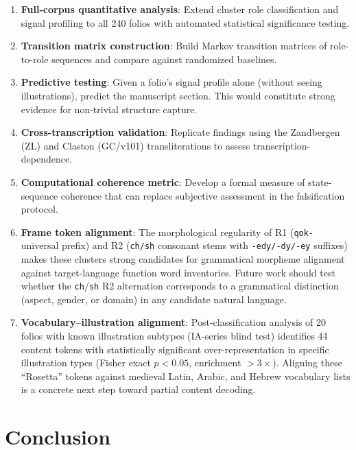 \documentclass[11pt,a4paper,twocolumn]{article}
\begin{document}
\begin{enumerate}[leftmargin=*,itemsep=2pt]
    \item \textbf{Full-corpus quantitative analysis}: Extend cluster role classification and signal profiling to all 240 folios with automated statistical significance testing.
    \item \textbf{Transition matrix construction}: Build Markov transition matrices of role-to-role sequences and compare against randomized baselines.
    \item \textbf{Predictive testing}: Given a folio's signal profile alone (without seeing illustrations), predict the manuscript section. This would constitute strong evidence for non-trivial structure capture.
    \item \textbf{Cross-transcription validation}: Replicate findings using the Zandbergen (ZL) and Claston (GC/v101) transliterations to assess transcription-dependence.
    \item \textbf{Computational coherence metric}: Develop a formal measure of state-sequence coherence that can replace subjective assessment in the falsification protocol.
    \item \textbf{Frame token alignment}: The morphological regularity of R1 (\texttt{qok-} universal prefix) and R2 (\texttt{ch/sh} consonant stems with \texttt{-edy/-dy/-ey} suffixes) makes these clusters strong candidates for grammatical morpheme alignment against target-language function word inventories. Future work should test whether the \texttt{ch}/\texttt{sh} R2 alternation corresponds to a grammatical distinction (aspect, gender, or domain) in any candidate natural language.
    \item \textbf{Vocabulary--illustration alignment}: Post-classification analysis of 20 folios with known illustration subtypes (IA-series blind test) identifies 44 content tokens with statistically significant over-representation in specific illustration types (Fisher exact $p < 0.05$, enrichment $> 3\times$). Aligning these ``Rosetta'' tokens against medieval Latin, Arabic, and Hebrew vocabulary lists is a concrete next step toward partial content decoding.
\end{enumerate}

\section{Conclusion}
\label{sec:conclusion}
\end{document}
